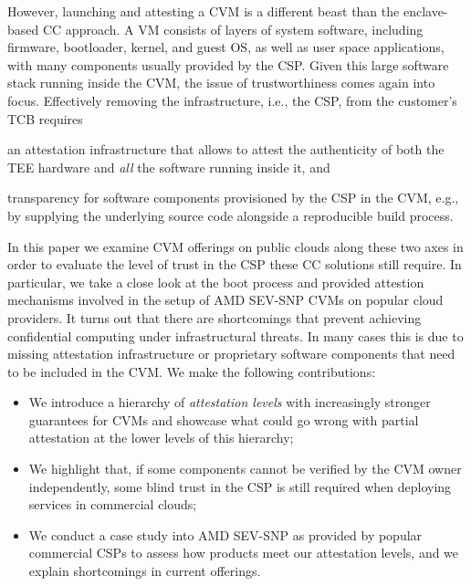 However, launching and attesting a \ac{CVM} is a different beast than the
enclave-based \ac{CC} approach. A VM consists of layers of system software,
including firmware, bootloader, kernel, and guest OS, as well as user space
applications, with many components usually provided by the \ac{CSP}.
%
Given this large software stack running inside the \ac{CVM}, the issue of
trustworthiness comes again into focus. Effectively removing the infrastructure,
i.e., the \ac{CSP}, from the customer's \ac{TCB} requires
\begin{paraenum}
\item an attestation infrastructure that allows to attest the authenticity of
  both the \ac{TEE} hardware and \emph{all} the software running inside it, and
\item transparency for software components provisioned by the \ac{CSP} in the
  \ac{CVM}, e.g., by supplying the underlying source code alongside a
  reproducible build process.
\end{paraenum}

In this paper we examine \ac{CVM} offerings on public clouds along these two
axes in order to evaluate the level of trust in the \ac{CSP} these \ac{CC}
solutions still require.  In particular, we take a close look at the boot
process and provided attestion mechanisms involved in the setup of AMD SEV-SNP
\acp{CVM} on popular cloud providers. It turns out that there are shortcomings
that prevent achieving confidential computing under infrastructural threats. In
many cases this is due to missing attestation infrastructure or proprietary
software components that need to be included in the \ac{CVM}.
We make the following contributions:
%
\begin{itemize}
%
    \item We introduce a hierarchy of \emph{attestation levels} with
increasingly stronger guarantees for \acp{CVM} and showcase what could go
wrong with partial attestation at the lower levels of this hierarchy;
%
    \item We highlight that, if some components cannot be verified by the
    \ac{CVM} owner independently, some blind trust in the \ac{CSP} is still
    required when deploying services in commercial clouds;
%
    \item We conduct a case study into AMD SEV-SNP as provided by popular
commercial \acp{CSP} to assess how products meet our attestation levels, and we
explain shortcomings in current offerings.
%
\end{itemize}

